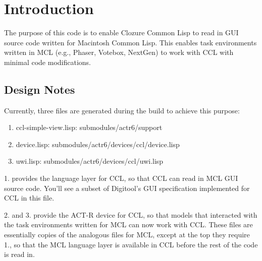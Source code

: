 \documentclass[12pt]{article} %
\begin{document}

\tableofcontents %

\newpage %


\section{Introduction} %

The purpose of this code is to enable Clozure Common Lisp to read in GUI source code written for Macintosh Common Lisp.
This enables task environments written in MCL (e.g., Phaser, Votebox, NextGen) to work with CCL with minimal code modifications. 

\subsection{Design Notes}

Currently, three files are generated during the build to achieve this purpose:

\begin{enumerate}[topsep=12pt]
    \item ccl-simple-view.lisp: submodules/actr6/support
    \item device.lisp: submodules/actr6/devices/ccl/device.lisp
    \item uwi.lisp: submodules/actr6/devices/ccl/uwi.lisp
\end{enumerate}

1. provides the language layer for CCL, so that CCL can read in MCL GUI source code.
You'll see a subset of Digitool's GUI specification implemented for CCL in this file.

2. and 3. provide the ACT-R device for CCL, so that models that interacted with the task environments written for MCL can now work with CCL.
These files are essentially copies of the analogous files for MCL, except at the top they require 1., so that the MCL language layer is available in CCL before the rest of the code is read in.
\end{document}
